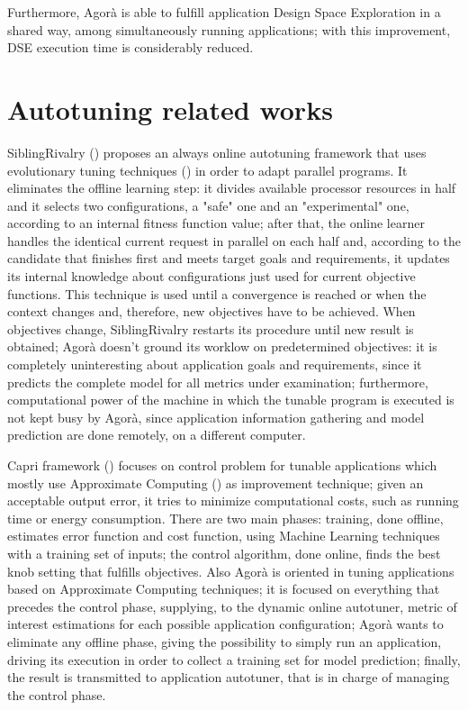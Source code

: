 Furthermore, Agorà is able to fulfill application Design Space Exploration in a shared way, among simultaneously running applications; with this improvement, DSE execution time is considerably reduced. 

\section{Autotuning related works}

SiblingRivalry (\cite{ansel2012siblingrivalry}) proposes an always online autotuning framework that uses evolutionary tuning techniques (\cite{coello2007evolutionary}) in order to adapt parallel programs. It eliminates the offline learning step: it divides available processor resources in half and it selects two configurations, a "safe" one and an "experimental" one, according to an internal fitness function value; after that, the online learner handles the identical current request in parallel on each half and, according to the candidate that finishes first and meets target goals and requirements, it updates its internal knowledge about configurations just used for current objective functions. This technique is used until a convergence is reached or when the context changes and, therefore, new objectives have to be achieved. When objectives change, SiblingRivalry restarts its procedure until new result is obtained; Agorà doesn't ground its worklow on predetermined objectives: it is completely uninteresting about application goals and requirements, since it predicts the complete model for all metrics under examination; furthermore, computational power of the machine in which the tunable program is executed is not kept busy by Agorà, since application information gathering and model prediction are done remotely, on a different computer.

Capri framework (\cite{sui2016proactive}) focuses on control problem for tunable applications which mostly use Approximate Computing (\cite{mittal2016survey}) as improvement technique; given an acceptable output error, it tries to minimize computational costs, such as running time or energy consumption. There are two main phases: training, done offline, estimates error function and cost function, using Machine Learning techniques with a training set of inputs; the control algorithm, done online, finds the best knob setting that fulfills objectives. Also Agorà is oriented in tuning applications based on Approximate Computing techniques; it is focused on everything that precedes the control phase, supplying, to the dynamic online autotuner, metric of interest estimations for each possible application configuration; Agorà wants to eliminate any offline phase, giving the possibility to simply run an application, driving its execution in order to collect a training set for model prediction; finally, the result is transmitted to application autotuner, that is in charge of managing the control phase.

